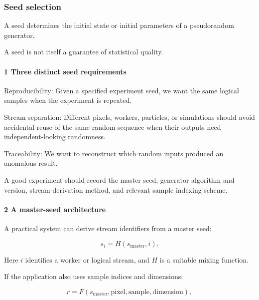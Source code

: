 \subsubsection{Seed selection}\label{02-foundations-ii-ch029-seed-selection}

\hypertarget{02-foundations-ii-ch029-seed-selection}{}

A seed determines the initial state or initial parameters of a pseudorandom generator.

A seed is not itself a guarantee of statistical quality.

\paragraph{1 Three distinct seed requirements}\label{02-foundations-ii-ch029-three-distinct-seed-requirements}

\hypertarget{02-foundations-ii-ch029-three-distinct-seed-requirements}{}

Reproducibility: Given a specified experiment seed, we want the same logical samples when the experiment is repeated.

Stream separation: Different pixels, workers, particles, or simulations should avoid accidental reuse of the same random sequence when their outputs need independent-looking randomness.

Traceability: We want to reconstruct which random inputs produced an anomalous result.

A good experiment should record the master seed, generator algorithm and version, stream-derivation method, and relevant sample indexing scheme.

\paragraph{2 A master-seed architecture}\label{02-foundations-ii-ch029-a-master-seed-architecture}

\hypertarget{02-foundations-ii-ch029-a-master-seed-architecture}{}

A practical system can derive stream identifiers from a master seed:

\[
 s_i=H(s_{\mathrm{master}},i).
\]

Here \(i\) identifies a worker or logical stream, and \(H\) is a suitable mixing function.

If the application also uses sample indices and dimensions:

\[
 r=F(s_{\mathrm{master}},\text{pixel},\text{sample},\text{dimension}),
\]

